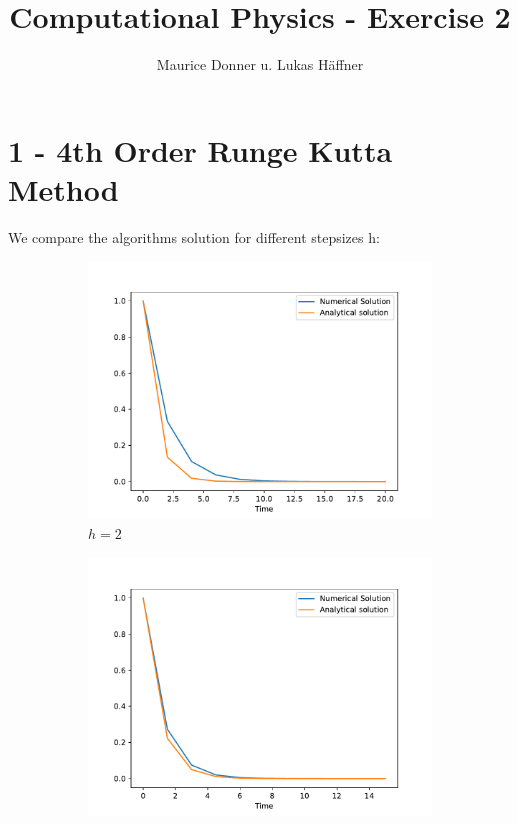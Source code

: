\documentclass{article}
\title{Computational Physics - Exercise 2}
\author{Maurice Donner u. Lukas Häffner}
\begin{document}
\newpage

\section*{1 - 4th Order Runge Kutta Method}

We compare the algorithms solution for different stepsizes h:

\begin{figure}[ht]
    \centering
    \begin{subfigure}{.32\textwidth}
	\includegraphics[width=\textwidth]{1_h_eq_2.pdf} 
	\caption{$h = 2$} 	
    \end{subfigure}
    \begin{subfigure}{.32\textwidth}
	\includegraphics[width=\textwidth]{1_h_eq_1p5.pdf} 

\end{subfigure}
\end{figure}
\end{document}
